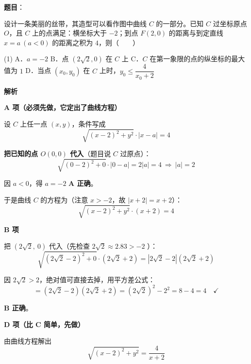 \begin{answer}

\textbf{题目}：

设计一条美丽的丝带，其造型可以看作图中曲线 $C$ 的一部分。已知 $C$ 过坐标原点 $O$，且 $C$ 上的点满足：横坐标大于 $-2$；到点 $F(2,0)$ 的距离与到定直线 $x=a\ (a<0)$ 的距离之积为 $4$，则\mbox{（　　）}
\nopagebreak[4]
\begin{center}\end{center}
\nopagebreak[4]
\begin{gkopts}(1)
\task A．$a=-2$
\task B．点 $\left(2\sqrt2,0\right)$ 在 $C$ 上
\task C．$C$ 在第一象限的点的纵坐标的最大值为 $1$
\task D．当点 $\left(x_0,y_0\right)$ 在 $C$ 上时，$y_0\le\dfrac{4}{x_0+2}$
\end{gkopts}

\textbf{解析}

\textbf{A 项（必须先做，它定出了曲线方程）}

设 $C$ 上任一点 $(x,y)$，条件写成
\nopagebreak[4]
\[\sqrt{(x-2)^{2}+y^{2}}\cdot|x-a|=4\]

\textbf{把已知的点 $O(0,0)$ 代入}（题目说 $C$ 过原点）：
\nopagebreak[4]
\[\sqrt{(0-2)^{2}+0}\cdot|0-a|=2|a|=4\ \Longrightarrow\ |a|=2\]

因 $a<0$，得 $a=-2$  \textbf{A 正确}。

于是曲线 $C$ 的方程为（注意 $x>-2$，故 $|x+2|=x+2$）：
\nopagebreak[4]
\[\boxed{\sqrt{(x-2)^{2}+y^{2}}\cdot(x+2)=4}\]

\par\medskip

\textbf{B 项}

把 $\left(2\sqrt2,\ 0\right)$ 代入（先检查 $2\sqrt2\approx2.83>-2$ ）：
\nopagebreak[4]
\[\sqrt{\left(2\sqrt2-2\right)^{2}+0}\cdot\left(2\sqrt2+2\right)=\left|2\sqrt2-2\right|\left(2\sqrt2+2\right)\]

因 $2\sqrt2>2$，绝对值可直接去掉，用平方差公式：
\nopagebreak[4]
\[=\left(2\sqrt2-2\right)\left(2\sqrt2+2\right)=\left(2\sqrt2\right)^{2}-2^{2}=8-4=4\quad\checkmark\]

 \textbf{B 正确}。

\par\medskip

\textbf{D 项（比 C 简单，先做）}

由曲线方程解出
\nopagebreak[4]
\[\sqrt{(x-2)^{2}+y^{2}}=\frac{4}{x+2}\]


\end{answer}
